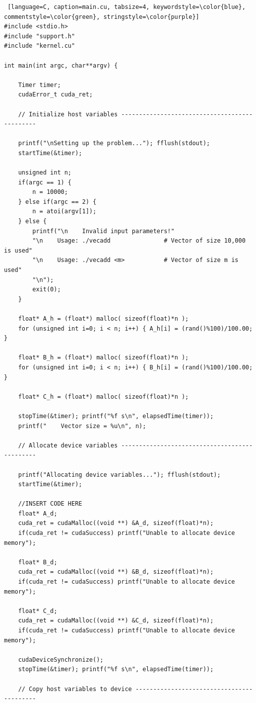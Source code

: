 \documentclass{article}
\begin{document}
\begin{lstlisting} [language=C, caption=main.cu, tabsize=4, keywordstyle=\color{blue}, commentstyle=\color{green}, stringstyle=\color{purple}]
#include <stdio.h>
#include "support.h"
#include "kernel.cu"

int main(int argc, char**argv) {
	
	Timer timer;
	cudaError_t cuda_ret;
	
	// Initialize host variables ----------------------------------------------
	
	printf("\nSetting up the problem..."); fflush(stdout);
	startTime(&timer);
	
	unsigned int n;
	if(argc == 1) {
		n = 10000;
	} else if(argc == 2) {
		n = atoi(argv[1]);
	} else {
		printf("\n    Invalid input parameters!"
		"\n    Usage: ./vecadd               # Vector of size 10,000 is used"
		"\n    Usage: ./vecadd <m>           # Vector of size m is used"
		"\n");
		exit(0);
	}
	
	float* A_h = (float*) malloc( sizeof(float)*n );
	for (unsigned int i=0; i < n; i++) { A_h[i] = (rand()%100)/100.00; }
	
	float* B_h = (float*) malloc( sizeof(float)*n );
	for (unsigned int i=0; i < n; i++) { B_h[i] = (rand()%100)/100.00; }
	
	float* C_h = (float*) malloc( sizeof(float)*n );
	
	stopTime(&timer); printf("%f s\n", elapsedTime(timer));
	printf("    Vector size = %u\n", n);
	
	// Allocate device variables ----------------------------------------------
	
	printf("Allocating device variables..."); fflush(stdout);
	startTime(&timer);
	
	//INSERT CODE HERE
	float* A_d;
	cuda_ret = cudaMalloc((void **) &A_d, sizeof(float)*n);
	if(cuda_ret != cudaSuccess) printf("Unable to allocate device memory");
	
	float* B_d;
	cuda_ret = cudaMalloc((void **) &B_d, sizeof(float)*n);
	if(cuda_ret != cudaSuccess) printf("Unable to allocate device memory");
	
	float* C_d;
	cuda_ret = cudaMalloc((void **) &C_d, sizeof(float)*n);
	if(cuda_ret != cudaSuccess) printf("Unable to allocate device memory");
	
	cudaDeviceSynchronize();
	stopTime(&timer); printf("%f s\n", elapsedTime(timer));
	
	// Copy host variables to device ------------------------------------------
	

\end{lstlisting}
\end{document}
